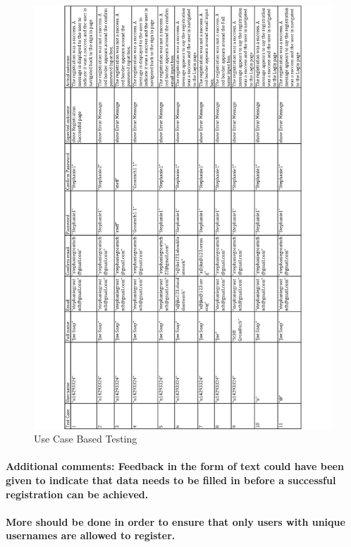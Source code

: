 \documentclass[english]{article}
\begin{document}
\begin{figure}[H]
\centering
\includegraphics[width=1.0\textwidth]{1.3}
\caption{Use Case Based Testing}
\end{figure}

\paragraph{Additional comments: \newline Feedback in the form of text could have been given to indicate that data needs to be filled in before a successful registration can be achieved.}

\paragraph{More should be done in order to ensure that only users with unique usernames are allowed to register.}
\end{document}
